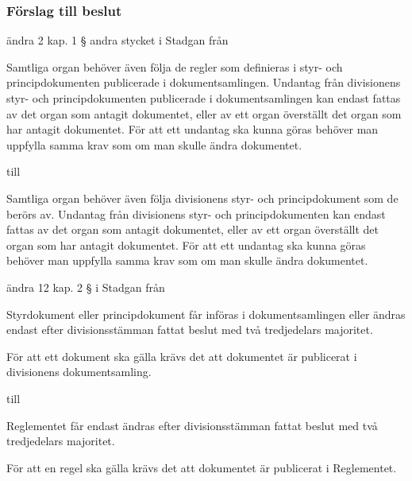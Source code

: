 \documentclass[protokoll]{dvd}
\begin{document}
\subsubsection*{Förslag till beslut}

\begin{attsatser}
	\item ändra 2 kap. 1 § andra stycket i Stadgan från

	\begin{displayquote}
		Samtliga organ behöver även följa de regler som definieras i styr- och principdokumenten publicerade i dokumentsamlingen.
		Undantag från divisionens styr- och principdokumenten publicerade i dokumentsamlingen kan endast fattas av det organ som antagit dokumentet, eller av ett organ överställt det organ som har antagit dokumentet.
		För att ett undantag ska kunna göras behöver man uppfylla samma krav som om man skulle ändra dokumentet.
	\end{displayquote}

	till

	\begin{displayquote}
		Samtliga organ behöver även följa divisionens styr- och principdokument som de berörs av.
		Undantag från divisionens styr- och principdokumenten kan endast fattas av det organ som antagit dokumentet, eller av ett organ överställt det organ som har antagit dokumentet.
		För att ett undantag ska kunna göras behöver man uppfylla samma krav som om man skulle ändra dokumentet.
	\end{displayquote}

	\item ändra 12 kap. 2 § i Stadgan från

	\begin{displayquote}
		Styrdokument eller principdokument får införas i dokumentsamlingen eller ändras endast efter divisionsstämman fattat beslut med två tredjedelars majoritet.

		För att ett dokument ska gälla krävs det att dokumentet är publicerat i divisionens dokumentsamling.
	\end{displayquote}

	till

	\begin{displayquote}
		Reglementet får endast ändras efter divisionsstämman fattat beslut med två tredjedelars majoritet.

		För att en regel ska gälla krävs det att dokumentet är publicerat i Reglementet.
	\end{displayquote}


\end{attsatser}
\end{document}
